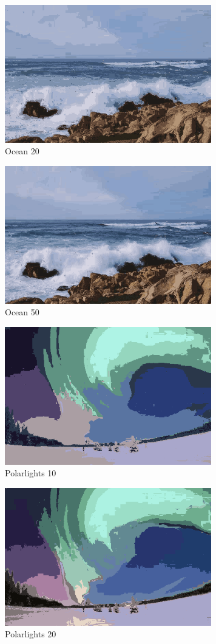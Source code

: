 \documentclass{article}
\begin{document}
\begin{figure}[ht!]
	\centering
	\caption{Ocean 20}
	\includegraphics[width=90mm]{ocean-em-k20-60.png}
\end{figure}

\begin{figure}[ht!]
	\centering
	\caption{Ocean 50}
	\includegraphics[width=90mm]{ocean-em-k50-24.png}
\end{figure}


\begin{figure}[ht!]
	\centering
	\caption{Polarlights 10}
	\includegraphics[width=90mm]{polarlights-em-k10-21.png}
\end{figure}

\begin{figure}[ht!]
	\centering
	\caption{Polarlights 20}
	\includegraphics[width=90mm]{polarlights-em-k20-44.png}
\end{figure}
\end{document}
